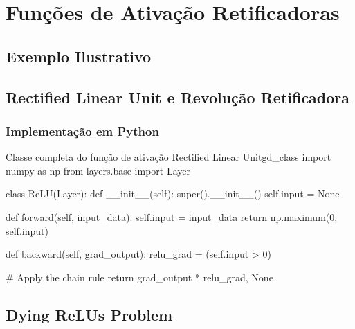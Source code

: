 
\chapter{Funções de Ativação Retificadoras}
\label{cap:ativacao-retificadoras}


\section{Exemplo Ilustrativo}


\section{Rectified Linear Unit e Revolução Retificadora}

\subsection{Implementação em Python}

\begin{codelisting}{Classe completa do função de ativação Rectified Linear Unit}{gd_class}
import numpy as np
from layers.base import Layer

class ReLU(Layer):
    def __init__(self):
        super().__init__()
        self.input = None

    def forward(self, input_data):
        self.input = input_data
        return np.maximum(0, self.input)

    def backward(self, grad_output):
        relu_grad = (self.input > 0)

        # Apply the chain rule
        return grad_output * relu_grad, None
\end{codelisting}

\section{Dying ReLUs Problem}

